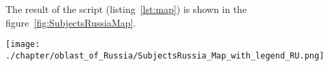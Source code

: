 The result of the script (listing~\protect\ref{lst:map}) is shown in the figure~\ref{fig:SubjectsRussiaMap}.

\begin{figure*}[h]
	\texttt{[image: ./chapter/oblast\_of\_Russia/SubjectsRussia\_Map\_with\_legend\_RU.png]}
	\caption[Map of the population by subjects of Russia, 2021.]{Population map by subjects of Russia, 2021. The subjects are divided into six groups by population and marked with different colors depending on the group the subject belongs to. The map is based on the data received by the request~\protect\ref{lst:map}.}%
      \label{fig:SubjectsRussiaMap}%
\end{figure*} 

